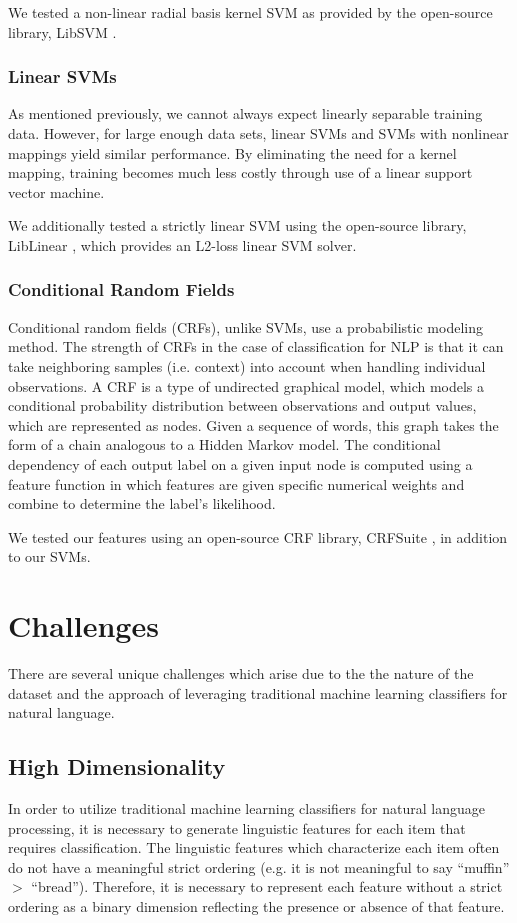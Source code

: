 \documentclass[preprint]{style}
\begin{document}
We tested a non-linear radial basis kernel SVM as provided by the open-source library, LibSVM \cite{libsvm}.

\subsubsection{Linear SVMs}
As mentioned previously, we cannot always expect linearly separable training data. However, for large enough data sets, linear SVMs and SVMs with nonlinear mappings yield similar performance. By eliminating the need for a kernel mapping, training becomes much less costly through use of a linear support vector machine. 

We additionally tested a strictly linear SVM using the open-source library, LibLinear \cite{liblinear}, which provides an L2-loss linear SVM solver.

\subsubsection{Conditional Random Fields}
Conditional random fields (CRFs), unlike SVMs, use a probabilistic modeling method. The strength of CRFs in the case of classification for NLP is that it can take neighboring samples (i.e. context) into account when handling individual observations. A CRF is a type of undirected graphical model, which models a conditional probability distribution between observations and output values, which are represented as nodes. Given a sequence of words, this graph takes the form of a chain analogous to a Hidden Markov model. The conditional dependency of each output label on a given input node is computed using a feature function in which features are given specific numerical weights and combine to determine the label's likelihood. 

We tested our features using an open-source CRF library, CRFSuite \cite{crfsuite}, in addition to our SVMs.

\section{Challenges}
There are several unique challenges which arise due to the the nature of the dataset and the approach of leveraging traditional machine learning classifiers for natural language.

\subsection{High Dimensionality}
In order to utilize traditional machine learning classifiers for natural language processing, it is necessary to generate linguistic features for each item that requires classification. The linguistic features which characterize each item often do not have a meaningful strict ordering (e.g. it is not meaningful to say ``muffin'' $>$ ``bread''). Therefore, it is necessary to represent each feature without a strict ordering as a binary dimension reflecting the presence or absence of that feature.
\end{document}
